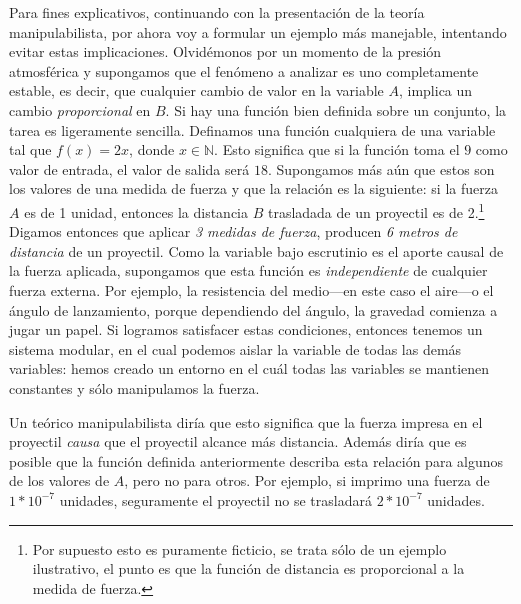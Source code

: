 {{Para fines explicativos, continuando con la presentación de
la teoría manipulabilista, por ahora voy a formular
un ejemplo más manejable, intentando evitar
estas implicaciones. Olvidémonos por un momento de la
presión atmosférica y supongamos que el fenómeno a analizar
es uno completamente estable, es decir, que cualquier cambio
de valor en la variable $ A $, implica un cambio
\emph{proporcional} en $ B $. Si hay una función bien
definida sobre un conjunto, la tarea es ligeramente
sencilla. Definamos una función cualquiera de una variable
tal que $ f(x) = 2x $, donde $ x \in  \mathbb{N} $. Esto
significa que si la función toma el $ 9 $ como valor de
entrada, el valor de salida será $ 18 $. Supongamos más aún
que estos son los valores de una medida de fuerza y que la
relación es la siguiente: si la fuerza $ A $ es de 1 unidad,
entonces la distancia $ B $ trasladada de un proyectil es de
2.\footnote{
	Por supuesto esto es puramente ficticio, se
	trata sólo de un ejemplo ilustrativo, el punto es
	que la función de distancia es proporcional a la
	medida de fuerza.
}
Digamos entonces que aplicar \emph{3 medidas de fuerza},
producen \emph{6 metros de distancia} de un proyectil. Como
la variable bajo escrutinio es el aporte causal de la
fuerza aplicada, supongamos que esta función es
\emph{independiente} de cualquier fuerza externa. Por
ejemplo, la resistencia del medio---en este caso el aire---o
el ángulo de lanzamiento, porque dependiendo del ángulo, la gravedad
comienza a jugar un papel. Si logramos satisfacer estas
condiciones, entonces tenemos un sistema modular, en el cual
podemos aislar la variable  de todas las demás
variables: hemos creado un entorno en el cuál todas las
variables se mantienen constantes y sólo manipulamos la
fuerza.

Un teórico manipulabilista diría que esto significa que la
fuerza impresa en el proyectil \emph{causa} que el proyectil
alcance más distancia. Además diría que es posible que la
función definida anteriormente describa esta relación
para algunos de los valores de $ A $, pero no para otros.
Por ejemplo, si imprimo una fuerza de $ 1*10^{-7} $
unidades, seguramente el proyectil no se trasladará $
2*10^{-7} $ unidades.

}}
